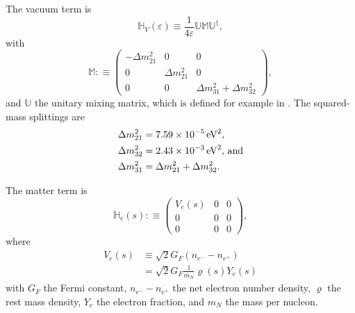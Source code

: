 \documentclass[aps,prd,twocolumn,superscriptaddress,groupedaddress]{revtex4}
\begin{document}
The vacuum term is
\begin{equation}
  \mathbb{H}_V(\varepsilon) \equiv \frac{1}{4\varepsilon}
  \mathbb{U}
  \mathbb{M}
  \mathbb{U}^\dagger,
\end{equation}
with
\begin{equation}
  \mathbb{M} :\equiv
  \left(
  \begin{matrix}
    -\Delta m^2_{21} & 0 & 0 \\
    0 & \Delta m^2_{21} & 0 \\
    0 & 0 & \Delta m^2_{31}+\Delta m^2_{32}
  \end{matrix}
  \right),
\end{equation}
and $\mathbb{U}$ the unitary mixing matrix, which is defined for example
in \cite{giun2007-nu_phys_and_astro}.
The squared-mass splittings are
\begin{align}
  \Delta m^2_{21} &= 7.59\times10^{-5}\,{\rm eV}^2, \nonumber\\
  \Delta m^2_{32} &= 2.43\times10^{-3}\,{\rm eV}^2, \,{\rm and} \nonumber \\
  \Delta m^2_{31} &= \Delta m^2_{21}+\Delta m^2_{32}. \nonumber
\end{align}

The matter term is
\begin{equation}
  \mathbb{H}_e(s) :\equiv
  \left(
  \begin{matrix}
    V_e(s) & 0 & 0 \\
    0 & 0 & 0 \\
    0 & 0 & 0
  \end{matrix}
  \right),
\end{equation}
where
\begin{align}
  V_e(s) & \equiv \sqrt{2} G_F (n_{e^-}-n_{e^+}) \nonumber \\
  \label{eq:matter_potential}
  &= \sqrt{2} G_F \frac{1}{m_N}\varrho(s)Y_e(s) 
\end{align}
with $G_F$ the Fermi constant,
$n_{e^-}-n_{e^+}$  the net electron number density,
$\varrho$ the rest mass density,
$Y_e$ the electron fraction, and
$m_N$ the mass per nucleon.
\end{document}
